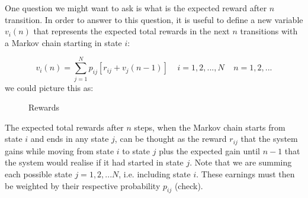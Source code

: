 \documentclass[\main/main.tex]{subfiles}
\begin{document}
One question we might want to ask is what is the expected reward after $n$ transition. In order to answer to this question, it is useful to define a new variable $v_i(n)$ that represents the expected total rewards in the next $n$ transitions with a Markov chain starting in state $i$:

\begin{equation}\label{rewards}
    v_i(n) = \sum_{j=1}^N p_{ij} [ r_{ij} + v_j(n-1) ] \; \;\;\; i = 1,2,...,N \;\;\;\; n=1,2,...
\end{equation}
we could picture this as:

\begin{figure}[H]
\centering
{}
\caption{Rewards}
\label{fig:markov_chain}
\end{figure}

\noindent The expected total rewards after $n$ steps, when the Markov chain starts from state $i$ and ends in any state $j$, can be thought as the reward $r_{ij}$ that the system gains while moving from state $i$ to state $j$ plus the expected gain until $n-1$ that the system would realise if it had started in state $j$. Note that we are summing each possible state $j = 1,2, ...N$, i.e. including state $i$. These earnings must then be weighted by their respective probability $p_{ij}$ (check).\\
\end{document}
